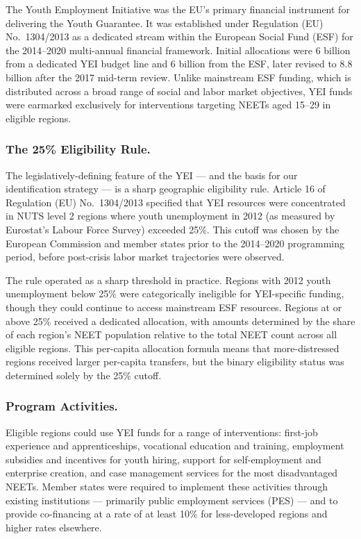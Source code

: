 \documentclass[12pt]{article}
\begin{document}
The Youth Employment Initiative was the EU's primary financial instrument for delivering the Youth Guarantee. It was established under Regulation (EU) No.~1304/2013 as a dedicated stream within the European Social Fund (ESF) for the 2014--2020 multi-annual financial framework. Initial allocations were \texteuro{}6 billion from a dedicated YEI budget line and \texteuro{}6 billion from the ESF, later revised to \texteuro{}8.8 billion after the 2017 mid-term review. Unlike mainstream ESF funding, which is distributed across a broad range of social and labor market objectives, YEI funds were earmarked exclusively for interventions targeting NEETs aged 15--29 in eligible regions.

\subsubsection*{The 25\% Eligibility Rule.} The legislatively-defining feature of the YEI --- and the basis for our identification strategy --- is a sharp geographic eligibility rule. Article 16 of Regulation (EU) No.~1304/2013 specified that YEI resources were concentrated in NUTS level 2 regions where youth unemployment in 2012 (as measured by Eurostat's Labour Force Survey) exceeded 25\%. This cutoff was chosen by the European Commission and member states prior to the 2014--2020 programming period, before post-crisis labor market trajectories were observed.

The rule operated as a sharp threshold in practice. Regions with 2012 youth unemployment below 25\% were categorically ineligible for YEI-specific funding, though they could continue to access mainstream ESF resources. Regions at or above 25\% received a dedicated allocation, with amounts determined by the share of each region's NEET population relative to the total NEET count across all eligible regions. This per-capita allocation formula means that more-distressed regions received larger per-capita transfers, but the binary eligibility status was determined solely by the 25\% cutoff.

\subsubsection*{Program Activities.} Eligible regions could use YEI funds for a range of interventions: first-job experience and apprenticeships, vocational education and training, employment subsidies and incentives for youth hiring, support for self-employment and enterprise creation, and case management services for the most disadvantaged NEETs. Member states were required to implement these activities through existing institutions --- primarily public employment services (PES) --- and to provide co-financing at a rate of at least 10\% for less-developed regions and higher rates elsewhere.
\end{document}
